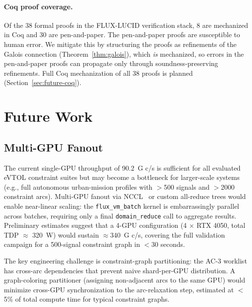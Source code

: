 \documentclass[conference]{IEEEtran}
\begin{document}
{\paragraph{Coq proof coverage.}
Of the 38 formal proofs in the FLUX-LUCID verification stack, 8 are
mechanized in Coq and 30 are pen-and-paper. The pen-and-paper proofs
are susceptible to human error. We mitigate this by structuring the
proofs as refinements of the Galois connection (Theorem~\ref{thm:galois}),
which \emph{is} mechanized, so errors in the pen-and-paper proofs can
propagate only through soundness-preserving refinements. Full Coq
mechanization of all 38 proofs is planned (Section~\ref{sec:future-coq}).


\section{Future Work}
\label{sec:future}

\subsection{Multi-GPU Fanout}
\label{sec:future-multigpu}

The current single-GPU throughput of 90.2~G c/s is sufficient for all
evaluated eVTOL constraint suites but may become a bottleneck for
larger-scale systems (e.g., full autonomous urban-mission profiles with
$>$500 signals and $>$2000 constraint arcs). Multi-GPU fanout via
NCCL~\cite{nccl} or custom all-reduce trees would enable near-linear
scaling: the \texttt{flux\_vm\_batch} kernel is embarrassingly parallel
across batches, requiring only a final \texttt{domain\_reduce} call to
aggregate results. Preliminary estimates suggest that a 4-GPU configuration
(4 $\times$ RTX 4050, total TDP $\approx$ 320~W) would sustain
$\approx$340~G c/s, covering the full validation campaign for a
500-signal constraint graph in $<$30 seconds.

The key engineering challenge is constraint-graph partitioning: the
AC-3 worklist has cross-arc dependencies that prevent naive
shard-per-GPU distribution. A graph-coloring partitioner (assigning
non-adjacent arcs to the same GPU) would minimize cross-GPU
synchronization to the arc-relaxation step, estimated at $<$5\% of
total compute time for typical constraint graphs.

}
\end{document}
